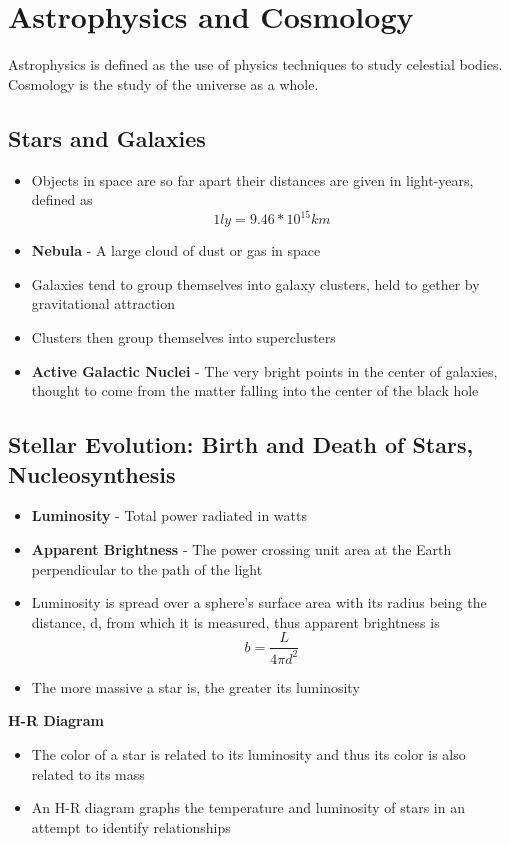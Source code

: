 \section{Astrophysics and Cosmology}
Astrophysics is defined as the use of physics techniques to study celestial bodies. Cosmology is the study of the universe as a whole. 

\subsection{Stars and Galaxies}
\begin{itemize}
    \item Objects in space are so far apart their distances are given in light-years, defined as \[1ly=9.46*10^{15}km\]
    \item \textbf{Nebula} - A large cloud of dust or gas in space
    \item Galaxies tend to group themselves into galaxy clusters, held to gether by gravitational attraction
    \item Clusters then group themselves into superclusters
    \item \textbf{Active Galactic Nuclei} - The very bright points in the center of galaxies, thought to come from the matter falling into the center of the black hole
\end{itemize}

\subsection{Stellar Evolution: Birth and Death of Stars, Nucleosynthesis}
\begin{itemize}
    \item \textbf{Luminosity} - Total power radiated in watts
    \item \textbf{Apparent Brightness} - The power crossing unit area at the Earth perpendicular to the path of the light
    \item Luminosity is spread over a sphere's surface area with its radius being the distance, d, from which it is measured, thus apparent brightness is \[b=\frac{L}{4\pi d^2}\]
    \item The more massive a star is, the greater its luminosity
\end{itemize}

\textbf{H-R Diagram}
\begin{itemize}
    \item The color of a star is related to its luminosity and thus its color is also related to its mass
    \item An H-R diagram graphs the temperature and luminosity of stars in an attempt to identify relationships
\end{itemize}

